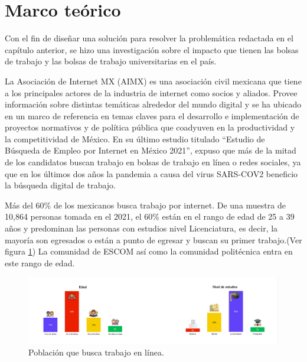 \clearpage
\section{Marco teórico}
Con el fin de diseñar una solución para resolver la problemática redactada en el capítulo anterior, se hizo una investigación sobre el impacto que tienen las bolsas de trabajo y las bolsas de trabajo universitarias en el país. 

La Asociación de Internet MX (AIMX) es una asociación civil mexicana que tiene a los principales actores de la industria  de internet como socios y aliados. Provee información sobre distintas temáticas alrededor del mundo digital y se ha ubicado  en un marco de referencia en temas claves para el desarrollo e implementación de proyectos normativos y de política pública  que coadyuven en la productividad y la competitividad de México.\cite{amiz1}
En su último  estudio titulado ``Estudio de Búsqueda de Empleo por Internet en México 2021'', expuso que más de la mitad de los candidatos buscan trabajo en bolsas de trabajo en línea o redes sociales, ya que en los últimos dos años la pandemia a causa del virus SARS-COV2 beneficio la búsqueda digital de trabajo.\cite{AIMX}\\
    \newline

   
Más del 60\% de los mexicanos busca trabajo por internet. De una muestra de 10,864 personas tomada en el 2021, el 60\% están en el rango de edad de 25 a 39 años y predominan las personas con estudios nivel Licenciatura, es decir, la mayoría son egresados o están a punto de egresar y buscan su primer  trabajo.(Ver figura \ref{mark:pob}) 
La comunidad de ESCOM así como la comunidad politécnica entra en este rango de edad.  
\begin{figure}[H]
        \begin{center}
            \includegraphics[width=.9\textwidth]{antecedentes/imagenes/porcen.jpeg}
        \end{center}
        \caption{Población que busca trabajo en línea.}
        \label{mark:pob}
    \end{figure}
    
